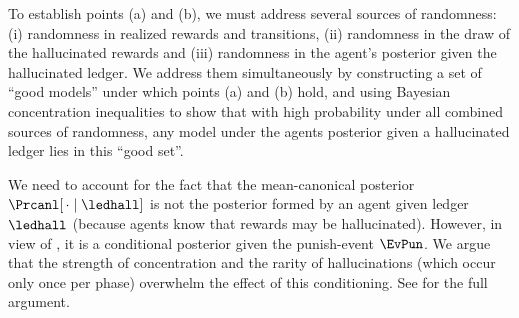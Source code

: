 To establish points (a) and (b), we must address several sources of randomness: (i) randomness in realized rewards and transitions, (ii) randomness in the draw of the hallucinated rewards and (iii) randomness in the agent's posterior given the hallucinated ledger. We address them simultaneously by constructing a set of ``good models'' under which points (a) and (b) hold, and using Bayesian concentration inequalities to show that with high probability under all combined sources of randomness, any model under the agents posterior given a hallucinated ledger lies in this ``good set''.

We need to account for the fact that the mean-canonical posterior
    $\Prcanl[\,\cdot \mid\ledhall]$
is not the posterior formed by an agent given ledger $\ledhall$ (because agents know that rewards may be hallucinated).
However, in view of ,
it is a conditional posterior given the punish-event $\EvPun$. We argue that the strength of concentration and the rarity of hallucinations (which occur only once per phase) overwhelm the effect of this conditioning. See  for the full argument.

